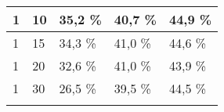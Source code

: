 \begin{table}[!htb]
\begin{tabular}{lllll}
\multicolumn{1}{|l|}{1}                                                      & \multicolumn{1}{l|}{10}                                                                                                       & \multicolumn{1}{l|}{35,2 \%}                                                                                          & \multicolumn{1}{l|}{40,7 \%}                                                                                           & \multicolumn{1}{l|}{44,9 \%}                                                                                           \\ \hline
\multicolumn{1}{|l|}{1}                                                      & \multicolumn{1}{l|}{15}                                                                                                       & \multicolumn{1}{l|}{34,3 \%}                                                                                          & \multicolumn{1}{l|}{41,0 \%}                                                                                           & \multicolumn{1}{l|}{44,6 \%}                                                                                           \\ \hline
\multicolumn{1}{|l|}{1}                                                      & \multicolumn{1}{l|}{20}                                                                                                       & \multicolumn{1}{l|}{32,6 \%}                                                                                          & \multicolumn{1}{l|}{41,0 \%}                                                                                           & \multicolumn{1}{l|}{43,9 \%}                                                                                           \\ \hline
\multicolumn{1}{|l|}{1}                                                      & \multicolumn{1}{l|}{30}                                                                                                       & \multicolumn{1}{l|}{26,5 \%}                                                                                          & \multicolumn{1}{l|}{39,5 \%}                                                                                           & \multicolumn{1}{l|}{44,5 \%}                                                                                           \\ \hline
                                                                             &                                                                                                                               &                                                                                                                       &                                                                                                                        &                                                                                                                        \\ \hline

\end{tabular}
\end{table}
